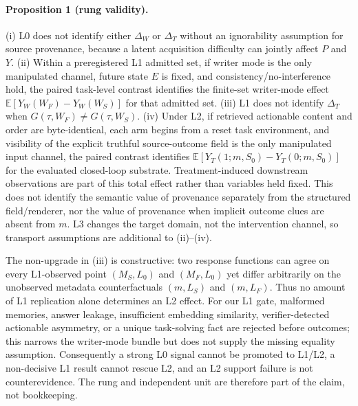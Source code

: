 \paragraph{Proposition 1 (rung validity).} (i) L0 does not identify either $\Delta_W$ or $\Delta_T$ without an ignorability assumption for source provenance, because a latent acquisition difficulty can jointly affect $P$ and $Y$. (ii) Within a preregistered L1 admitted set, if writer mode is the only manipulated channel, future state $E$ is fixed, and consistency/no-interference hold, the paired task-level contrast identifies the finite-set writer-mode effect $\mathbb{E}[Y_W(W_F)-Y_W(W_S)]$ for that admitted set. (iii) L1 does not identify $\Delta_T$ when $G(\tau,W_F)\neq G(\tau,W_S)$. (iv) Under L2, if retrieved actionable content and order are byte-identical, each arm begins from a reset task environment, and visibility of the explicit truthful source-outcome field is the only manipulated input channel, the paired contrast identifies $\mathbb{E}[Y_T(1;m,S_0)-Y_T(0;m,S_0)]$ for the evaluated closed-loop substrate. Treatment-induced downstream observations are part of this total effect rather than variables held fixed. This does not identify the semantic value of provenance separately from the structured field/renderer, nor the value of provenance when implicit outcome clues are absent from $m$. L3 changes the target domain, not the intervention channel, so transport assumptions are additional to (ii)--(iv).

The non-upgrade in (iii) is constructive: two response functions can agree on every L1-observed point $(M_S,L_0)$ and $(M_F,L_0)$ yet differ arbitrarily on the unobserved metadata counterfactuals $(m,L_S)$ and $(m,L_F)$. Thus no amount of L1 replication alone determines an L2 effect. For our L1 gate, malformed memories, answer leakage, insufficient embedding similarity, verifier-detected actionable asymmetry, or a unique task-solving fact are rejected before outcomes; this narrows the writer-mode bundle but does not supply the missing equality assumption. Consequently a strong L0 signal cannot be promoted to L1/L2, a non-decisive L1 result cannot rescue L2, and an L2 support failure is not counterevidence. The rung and independent unit are therefore part of the claim, not bookkeeping.

